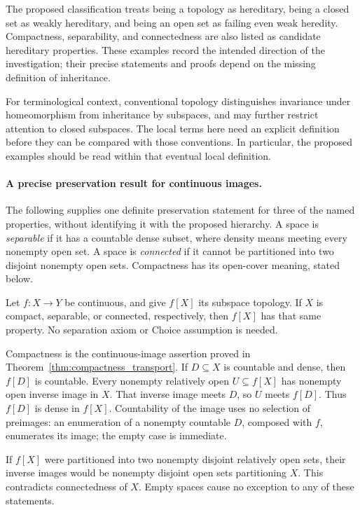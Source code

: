 The proposed classification treats being a topology as hereditary, being
a closed set as weakly hereditary, and being an open set as failing even
weak heredity. Compactness, separability, and connectedness are also
listed as candidate hereditary properties. These examples record the
intended direction of the investigation; their precise statements and
proofs depend on the missing definition of inheritance.

For terminological context, conventional topology distinguishes
invariance under homeomorphism from inheritance by subspaces, and may
further restrict attention to closed subspaces. The local terms here
need an explicit definition before they can be compared with those
conventions. In particular, the proposed examples should be read within
that eventual local definition.

\paragraph{A precise preservation result for continuous images.}
The following supplies one definite preservation statement for three of
the named properties, without identifying it with the proposed hierarchy.
A space is \emph{separable} if it has a countable dense subset, where
density means meeting every nonempty open set. A space is
\emph{connected} if it cannot be partitioned into two disjoint nonempty
open sets. Compactness has its open-cover meaning, stated below.

\begin{proposition}
\label{prop:continuous_image_properties}
Let $f:X\to Y$ be continuous, and give $f[X]$ its subspace topology.
If $X$ is compact, separable, or connected, respectively, then $f[X]$
has that same property. No separation axiom or Choice assumption is
needed.
\end{proposition}
\Proof
Compactness is the continuous-image assertion proved in
Theorem~\ref{thm:compactness_transport}. If $D\subseteq X$ is countable
and dense, then $f[D]$ is countable. Every nonempty relatively open
$U\subseteq f[X]$ has nonempty open inverse image in $X$. That inverse
image meets $D$, so $U$ meets $f[D]$. Thus $f[D]$ is dense in $f[X]$.
Countability of the image uses no selection of preimages: an enumeration
of a nonempty countable $D$, composed with $f$, enumerates its image;
the empty case is immediate.

If $f[X]$ were partitioned into two nonempty disjoint relatively open
sets, their inverse images would be nonempty disjoint open sets
partitioning $X$. This contradicts connectedness of $X$. Empty spaces
cause no exception to any of these statements.
\Done


